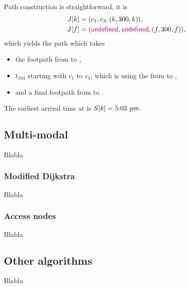 	Path construction is straightforward, it is
	\begin{align*}
		J[k]	&= (c_1, c_3, (k, 300, k)),\\
		J[f]	&= (\textcolor{magenta}{\textsf{undefined}}, \textcolor{magenta}{\textsf{undefined}}, (f, 300, f)),
	\end{align*}
	which yields the path which takes
	\begin{itemize}
		\item[] the footpath from \freiburg to \freiburg,
		\item[] $t_{104}$ starting with $c_1$ to $c_3$, which is using the \ticef from \freiburg to \karlsruhe,
		\item[] and a final footpath from \karlsruhe to \karlsruhe.
	\end{itemize}
	The earliest arrival time at \karlsruhe is $S[k] = 5\text{:}03\textit{ pm}$.
	
\subsection{Multi-modal}
	Blabla

\subsubsection{Modified Dijkstra}\label{modifiedDijkstra}
	Blabla

\subsubsection{Access nodes}\label{accessNodes}
	Blabla

\subsection{Other algorithms}
	Blabla